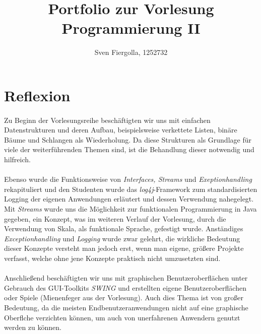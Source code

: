 \documentclass[10pt, a4paper]{article}
\author{Sven Fiergolla, 1252732}
\title{Portfolio zur Vorlesung Programmierung II}
\begin{document}
 

\clearpage\maketitle
\thispagestyle{empty}
\pagebreak


\section*{Reflexion}

\paragraph*{}
Zu Beginn der Vorlesungsreihe beschäftigten wir uns mit einfachen Datenstrukturen und deren Aufbau, beispielsweise verkettete Listen, binäre Bäume und Schlangen als Wiederholung. Da diese Strukturen als Grundlage für viele der weiterführenden Themen sind, ist die Behandlung dieser notwendig und hilfreich.\par

\paragraph*{}
Ebenso wurde die Funktionsweise von \textit{Interfaces, Streams} und \textit{Exeptionhandling} rekapituliert und den Studenten wurde das \textit{log4j}-Framework zum standardisierten Logging der eigenen Anwendungen erläutert und dessen Verwendung nahegelegt. Mit \textit{Streams} wurde uns die Möglichkeit zur funktionalen Programmierung in Java gegeben, ein Konzept, was im weiteren Verlauf der Vorlesung, durch die Verwendung von Skala, als funktionale Sprache, gefestigt wurde. Anständiges \textit{Exceptionhandling} und \textit{Logging} wurde zwar gelehrt, die wirkliche Bedeutung dieser Konzepte versteht man jedoch erst, wenn man eigene, größere Projekte verfasst, welche ohne jene Konzepte praktisch nicht umzusetzten sind.\par


\paragraph*{}
Anschließend beschäftigten wir uns mit graphischen Benutzeroberflächen unter Gebrauch des GUI-Toolkits \textit{SWING} und erstellten eigene Benutzeroberflächen oder Spiele (Mienenfeger aus der Vorlesung). Auch dies Thema ist von großer Bedeutung, da die meisten Endbenutzeranwendungen nicht auf eine graphische Oberflche verzichten können, um auch von unerfahrenen Anwendern genutzt werden zu können.
\par
\end{document}

